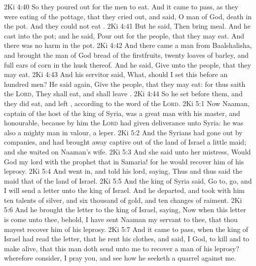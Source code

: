 \vs 2Ki 4:40 So they poured out for the men to eat. And it came to pass, as they were eating of the pottage, that they cried out, and said, O  man of God,  death in the pot. And they could not eat .
\vs 2Ki 4:41 But he said, Then bring meal. And he cast  into the pot; and he said, Pour out for the people, that they may eat. And there was no harm in the pot.
\vs 2Ki 4:42 And there came a man from Baalshalisha, and brought the man of God bread of the firstfruits, twenty loaves of barley, and full ears of corn in the husk thereof. And he said, Give unto the people, that they may eat.
\vs 2Ki 4:43 And his servitor said, What, should I set this before an hundred men? He said again, Give the people, that they may eat: for thus saith the \textsc{Lord}, They shall eat, and shall leave .
\vs 2Ki 4:44 So he set  before them, and they did eat, and left , according to the word of the \textsc{Lord}.
\vs 2Ki 5:1 Now Naaman, captain of the host of the king of Syria, was a great man with his master, and honourable, because by him the \textsc{Lord} had given deliverance unto Syria: he was also a mighty man in valour,  a leper.
\vs 2Ki 5:2 And the Syrians had gone out by companies, and had brought away captive out of the land of Israel a little maid; and she waited on Naaman's wife.
\vs 2Ki 5:3 And she said unto her mistress, Would God my lord  with the prophet that  in Samaria! for he would recover him of his leprosy.
\vs 2Ki 5:4 And  went in, and told his lord, saying, Thus and thus said the maid that  of the land of Israel.
\vs 2Ki 5:5 And the king of Syria said, Go to, go, and I will send a letter unto the king of Israel. And he departed, and took with him ten talents of silver, and six thousand  of gold, and ten changes of raiment.
\vs 2Ki 5:6 And he brought the letter to the king of Israel, saying, Now when this letter is come unto thee, behold, I have  sent Naaman my servant to thee, that thou mayest recover him of his leprosy.
\vs 2Ki 5:7 And it came to pass, when the king of Israel had read the letter, that he rent his clothes, and said,  I God, to kill and to make alive, that this man doth send unto me to recover a man of his leprosy? wherefore consider, I pray you, and see how he seeketh a quarrel against me.
